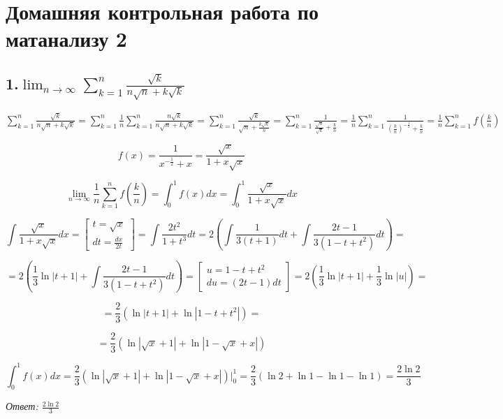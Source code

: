 \documentclass[a4paper]{article}
\author{Васильев Павел}
\begin{document}
\section*{Домашняя контрольная работа по матанализу 2}

\subsection*{1.$\displaystyle \lim_{n \rightarrow \infty} \sum_{k=1}^n \frac{\sqrt{k}}{n \sqrt{n} + k \sqrt{k}}$}

$\displaystyle \sum_{k=1}^n \frac{\sqrt{k}}{n \sqrt{n} + k \sqrt{k}} = \sum_{k=1}^n  \frac{1}{n} \sum_{k=1}^n \frac{n \sqrt{k}}{n \sqrt{n} + k \sqrt{k}} = \sum_{k=1}^n  \frac{\sqrt{k}}{\sqrt{n} + \frac{k \sqrt{k}}{n}} = \sum_{k=1}^n \frac{1}{\frac{\sqrt{n}}{\sqrt{k}} + \frac{k}{n}} = \frac{1}{n} \sum_{k=1}^n \frac{1}{ \left( \frac{k}{n} \right)^{-\frac{1}{2}} + \frac{k}{n}} = \frac{1}{n} \sum_{k=1}^n f \left( \frac{k}{n} \right)$

\[ \displaystyle f(x) = \frac{1}{x^{-\frac{1}{2}} + x} = \frac{ \sqrt{x} }{1 + x \sqrt{x}}
\]

\[
\displaystyle \lim_{n \rightarrow \infty} \frac{1}{n} \sum_{k=1}^n f \left(\frac{k}{n} \right) = \int_0^1 f(x) dx = \int_0^1 \frac{ \sqrt{x} }{1 + x \sqrt{x}} dx
\]

\[
\int \frac{ \sqrt{x} }{1 + x \sqrt{x}} dx = \begin{bmatrix}
t = \sqrt{x} \\
 dt = \frac{dx}{2t}
\end{bmatrix}
= \int \frac{2t^2}{1+t^3} dt = 2 \left( \int \frac{1}{3(t+1)} dt + \int \frac{2t-1}{3(1-t+t^2)} dt \right) =
\]

\[
= 2 \left( \frac{1}{3} \ln |t+1| +\int \frac{2t-1}{3(1-t+t^2)} dt \right) = \begin{bmatrix}
u = 1-t+t^2 \\ du = (2t-1)dt
\end{bmatrix} = 2 \left( \frac{1}{3} \ln |t+1| + \frac{1}{3} \ln|u| \right) =
\]

\[
= \frac{2}{3} \left(\ln |t+1| + \ln|1-t+t^2| \right) = 
\]

\[
= \frac{2}{3} \left( \ln |\sqrt{x}+1| + \ln|1-\sqrt{x}+x| \right)
\]

\[
\int_0^1 f(x)dx = \frac{2}{3} \left( \ln |\sqrt{x}+1| + \ln|1-\sqrt{x}+x| \right) \bigg|_0^1 = \frac{2}{3} \left( \ln 2 + \ln 1 - \ln 1 - \ln 1 \right) = \frac{2 \ln 2}{3}
\]

\textit{Ответ: $\frac{2 \ln 2}{3}$}
\end{document}
